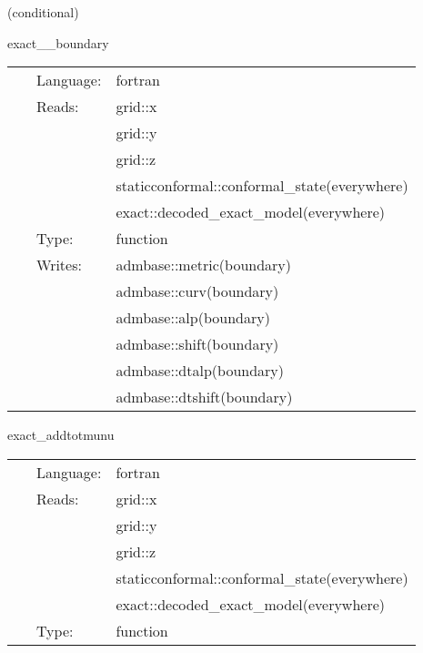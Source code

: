\vspace{5mm}

   (conditional) 

\hspace{5mm} exact\_\_boundary 

\hspace{5mm}{\it overwrite g and k on the boundary with exact solution data } 


\hspace{5mm}

 \begin{tabular*}{160mm}{cll} 
~ & Language:  & fortran \\ 
~ & Reads:  & grid::x \\ 
~& ~ &grid::y\\ 
~& ~ &grid::z\\ 
~& ~ &staticconformal::conformal\_state(everywhere)\\ 
~& ~ &exact::decoded\_exact\_model(everywhere)\\ 
~ & Type:  & function \\ 
~ & Writes:  & admbase::metric(boundary) \\ 
~& ~ &admbase::curv(boundary)\\ 
~& ~ &admbase::alp(boundary)\\ 
~& ~ &admbase::shift(boundary)\\ 
~& ~ &admbase::dtalp(boundary)\\ 
~& ~ &admbase::dtshift(boundary)\\ 
\end{tabular*} 


\vspace{5mm}


\hspace{5mm} exact\_addtotmunu 

\hspace{5mm}{\it set stress energy tansor based on exact solution } 


\hspace{5mm}

 \begin{tabular*}{160mm}{cll} 
~ & Language:  & fortran \\ 
~ & Reads:  & grid::x \\ 
~& ~ &grid::y\\ 
~& ~ &grid::z\\ 
~& ~ &staticconformal::conformal\_state(everywhere)\\ 
~& ~ &exact::decoded\_exact\_model(everywhere)\\ 
~ & Type:  & function \\ 
\end{tabular*} 


